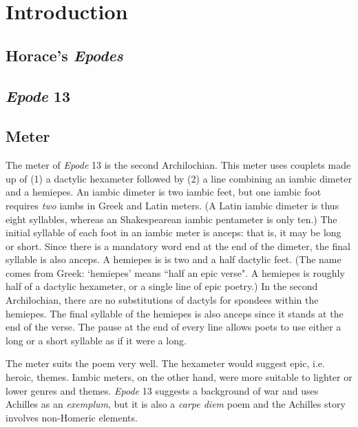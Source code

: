 \chapter*{Introduction}

\section*{Horace's \textit{Epodes}}

\section*{\textit{Epode} 13}

\section*{Meter}

The meter of \textit{Epode} 13 is the second Archilochian. This meter uses
couplets made up of (1) a dactylic hexameter followed by (2) a line combining
an iambic dimeter and a hemiepes.  An iambic dimeter is two iambic feet, but
one iambic foot requires \textit{two} iambs in Greek and Latin meters.  (A
Latin iambic dimeter is thus eight syllables, whereas an Shakespearean iambic
pentameter is only ten.)  The initial syllable of each foot in an iambic meter
is anceps: that is, it may be long or short.  Since there is a mandatory word
end at the end of the dimeter, the final syllable is also anceps.  A hemiepes
is is two and a half dactylic feet.  (The name comes from Greek: `hemiepes'
means ``half an epic verse".  A hemiepes is roughly half of a dactylic
hexameter, or a single line of epic poetry.)  In the second Archilochian, there
are no substitutions of dactyls for spondees within the hemiepes.  The final
syllable of the hemiepes is also anceps since it stands at the end of the
verse.  The pause at the end of every line allows poets to use either a long or
a short syllable as if it were a long.\newline

\indent\metra{\m\mbb\m\mbb\m\c\mbb\m\mbb\m\bb\m\mb}

\indent\indent\metra{\mb\m\b\m\mb\m\b\mb\cc\m\bb\m\bb\mb}\newline

The meter suits the poem very well.  The hexameter would suggest epic, i.e.
heroic, themes.  Iambic meters, on the other hand, were more suitable to
lighter or lower genres and themes.  \textit{Epode} 13 suggests a background of
war and uses Achilles as an \textit{exemplum}, but it is also a \textit{carpe
diem} poem and the Achilles story involves non-Homeric elements.

